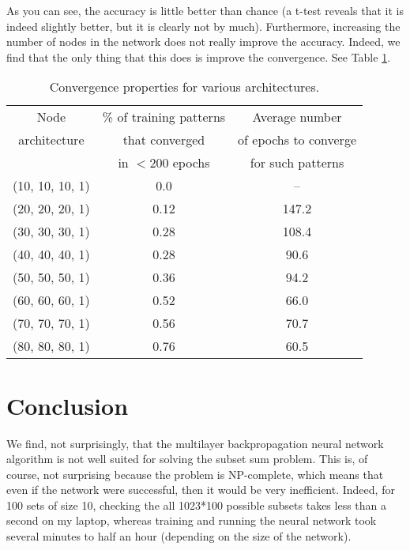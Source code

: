 \documentclass[12pt]{article}
\begin{document}
As you can see, the accuracy is little better than chance (a t-test reveals that it is indeed slightly better, but it is clearly not by much).  Furthermore, increasing the number of nodes in the network does not really improve the accuracy.  Indeed, we find that the only thing that this does is improve the convergence.  See Table \ref{Convergence-Table}.
\begin{table}[h!]
    \begin{center}
    \begin{tabular}{|c|c|c|}
        \hline
        Node & \% of training patterns & Average number \\
        architecture &  that converged & of epochs to converge\\
         & in $< 200$ epochs &  for such patterns\\
        \hline
        (10, 10, 10, 1) & 0.0 & --\\
        \hline
        (20, 20, 20, 1) & 0.12 & 147.2\\
        \hline
        (30, 30, 30, 1) & 0.28 & 108.4\\
        \hline
        (40, 40, 40, 1) & 0.28 & 90.6\\
        \hline
        (50, 50, 50, 1) & 0.36 & 94.2\\
        \hline
        (60, 60, 60, 1) & 0.52 & 66.0\\
        \hline
        (70, 70, 70, 1) & 0.56 & 70.7\\
        \hline
        (80, 80, 80, 1) & 0.76 & 60.5\\
        \hline
    \end{tabular}
    \end{center}
    \caption{Convergence properties for various architectures.}
    \label{Convergence-Table}
\end{table}

\section{Conclusion}
We find, not surprisingly, that the multilayer backpropagation neural network algorithm is not well suited for solving the subset sum problem.  This is, of course, not surprising because the problem is NP-complete, which means that even if the network were successful, then it would be very inefficient.  Indeed, for 100 sets of size 10, checking the all 1023*100 possible subsets takes less than a second on my laptop, whereas training and running the neural network took several minutes to half an hour (depending on the size of the network).
\end{document}
